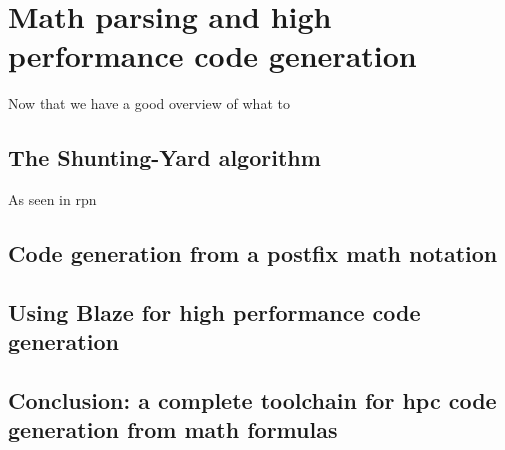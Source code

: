 \documentclass[../main]{subfiles}
\begin{document}

\section{
  Math parsing and high performance code generation
}

Now that we have a good overview of what to

\subsection{
  The Shunting-Yard algorithm
}

As seen in \gls{rpn}

\subsection{
  Code generation from a postfix math notation
}

\subsection{
  Using Blaze for high performance code generation
}


\subsection{
  Conclusion: a complete toolchain for \acrlong{hpc} code generation from math formulas
}
\end{document}
